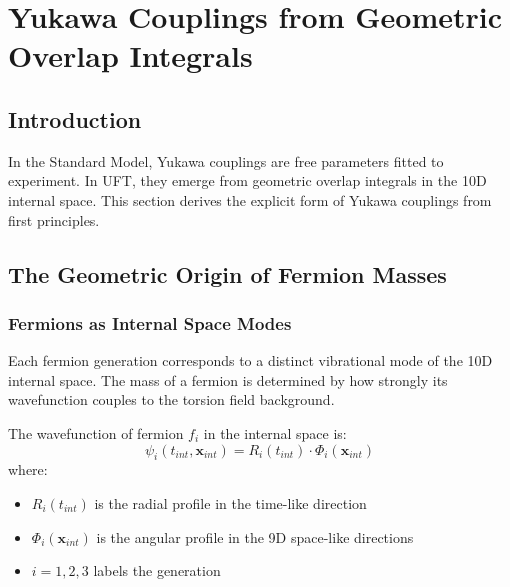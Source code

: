 \section{Yukawa Couplings from Geometric Overlap Integrals}
\label{sec:yukawa_geometric}

\subsection{Introduction}

In the Standard Model, Yukawa couplings are free parameters fitted to experiment. In UFT, they emerge from geometric overlap integrals in the 10D internal space. This section derives the explicit form of Yukawa couplings from first principles.

\subsection{The Geometric Origin of Fermion Masses}

\subsubsection{Fermions as Internal Space Modes}

\begin{insight}
Each fermion generation corresponds to a distinct vibrational mode of the 10D internal space. The mass of a fermion is determined by how strongly its wavefunction couples to the torsion field background.
\end{insight}

\begin{definition}
The wavefunction of fermion $f_i$ in the internal space is:
\begin{equation}
    \psi_i(t_{int}, \mathbf{x}_{int}) = R_i(t_{int}) \cdot \Phi_i(\mathbf{x}_{int})
\end{equation}
where:
\begin{itemize}
    \item $R_i(t_{int})$ is the radial profile in the time-like direction
    \item $\Phi_i(\mathbf{x}_{int})$ is the angular profile in the 9D space-like directions
    \item $i = 1, 2, 3$ labels the generation
\end{itemize}
\end{definition}

